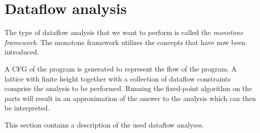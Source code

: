\section{Dataflow analysis}
The type of dataflow analysis that we want to perform is called the \emph{monotone framework}.
The monotone framework utilizes the concepts that have now been introduced.

A CFG of the program is generated to represent the flow of the program.
A lattice with finite height together with a collection of dataflow constraints comprise the analysis to be performed.
Running the fixed-point algorithm on the parts will result in an approximation of the answer to the analysis which can then be interpreted.

This section contains a description of the used dataflow analyses. 
